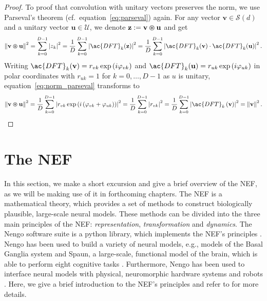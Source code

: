 \begin{proof}
    To proof that convolution with unitary vectors preserves the norm, we use Parseval's theorem (cf.\ equation~\eqref{eq:parseval}) again.
	For any vector $ \mathbf{v} \in \mathcal{S}(d)$ and  a unitary vector $ \mathbf{u} \in \mathcal{U}$, we denote $ \mathbf{z}:=  \mathbf{v} \varoast \mathbf{u}$ and get
	\begin{equation}
	\label{eq:norm_parseval}
	\norm{ \mathbf{v} \varoast \mathbf{u}}^{2} = \sum_{k=0}^{D-1} \left|z_{k}\right|^{2} = \frac{1}{D} \sum_{k=0}^{D-1} \left|\ac{DFT}_{k}( \mathbf{z})\right|^{2} = \frac{1}{D} \sum_{k=0}^{D-1} \left|\ac{DFT}_{k}( \mathbf{v}) \cdot \ac{DFT}_{k}( \mathbf{u})\right|^{2}.
	\end{equation}
	Writing $\ac{DFT}_{k}( \mathbf{v}) = r_{vk}\exp\left(i\varphi_{vk}\right)$ and $\ac{DFT}_{k}( \mathbf{u}) = r_{uk}\exp\left(i\varphi_{uk}\right)$ in polar coordinates with $r_{uk} = 1$ for $k=0, \ldots, D-1$ as $u$ is unitary, equation~\eqref{eq:norm_parseval} transforms to
	\begin{equation*}
	\norm{ \mathbf{v} \varoast \mathbf{u}}^{2} = \frac{1}{D} \sum_{k=0}^{D-1} \left|r_{vk} \exp\left(i\left(\varphi_{vk} + \varphi_{uk}\right)\right)\right|^{2} = \frac{1}{D} \sum_{k=0}^{D-1} \left|r_{vk}\right|^{2} = \frac{1}{D} \sum_{k=0}^{D-1} \left|\ac{DFT}_k\left( \mathbf{v}\right)\right|^{2} = \norm{ \mathbf{v}}^{2}.
	\end{equation*}
\end{proof}

\section{The \acl{NEF}}
\label{sec:neural_eng}

In this section, we make a short excursion and give a brief overview of the \acf{NEF}, as we will be making use of it in forthcoming chapters.
The \ac{NEF} \parencite{Eliasmith2003} is a mathematical theory, which provides a set of methods to construct biologically plausible, large-scale neural models.
These methods can be divided into the three main principles of the \ac{NEF}: \emph{representation}, \emph{transformation} and \emph{dynamics}.
The \ac{Nengo}  software suite is a python library, which implements the \ac{NEF}'s principles \parencite{Bekolay2014}.
\ac{Nengo} has been used to build a variety of neural models, e.g., models of the Basal Ganglia system \parencite{Stewart2010, Stewart2012} and \acf{Spaun}, a large-scale, functional model of the brain, which is able to perform eight cognitive tasks \parencite{Eliasmith2012}.
Furthermore, \ac{Nengo} has been used to interface neural models with physical, neuromorphic hardware systems and robots \parencites{Conradt2014, Stewart2016, Mirus2018a}.
Here, we give a brief introduction to the \ac{NEF}'s principles and refer to \textcite{Eliasmith2003, Eliasmith2013, Bekolay2014} for more details.
